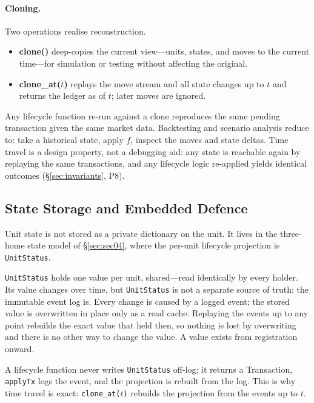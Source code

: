 \paragraph{Cloning.} Two operations realise reconstruction.

\begin{itemize}[nosep]
\item \textbf{clone()} deep-copies the current view---units, states, and moves to the current time---for simulation or testing without affecting the original.
\item \textbf{clone\_at($t$)} replays the move stream and all state changes up to $t$ and returns the ledger as of $t$; later moves are ignored.
\end{itemize}

\noindent Any lifecycle function re-run against a clone reproduces the same pending transaction given the same market data. Backtesting and scenario analysis reduce to: take a historical state, apply $f$, inspect the moves and state deltas. Time travel is a design property, not a debugging aid: any state is reachable again by replaying the same transactions, and any lifecycle logic re-applied yields identical outcomes (\S\ref{sec:invariants}, P8).

\subsection{State Storage and Embedded Defence}

Unit state is not stored as a private dictionary on the unit. It lives in the three-home state model of \S\ref{sec:sec04}, where the per-unit lifecycle projection is \texttt{UnitStatus}.

\begin{remark}
\texttt{UnitStatus} holds one value per unit, shared---read identically by every holder. Its value changes over time, but \texttt{UnitStatus} is not a separate source of truth: the immutable event log is. Every change is caused by a logged event; the stored value is overwritten in place only as a read cache. Replaying the events up to any point rebuilds the exact value that held then, so nothing is lost by overwriting and there is no other way to change the value. A value exists from registration onward.
\end{remark}

\noindent A lifecycle function never writes \texttt{UnitStatus} off-log; it returns a Transaction, \texttt{applyTx} logs the event, and the projection is rebuilt from the log. This is why time travel is exact: \texttt{clone\_at($t$)} rebuilds the projection from the events up to $t$.

